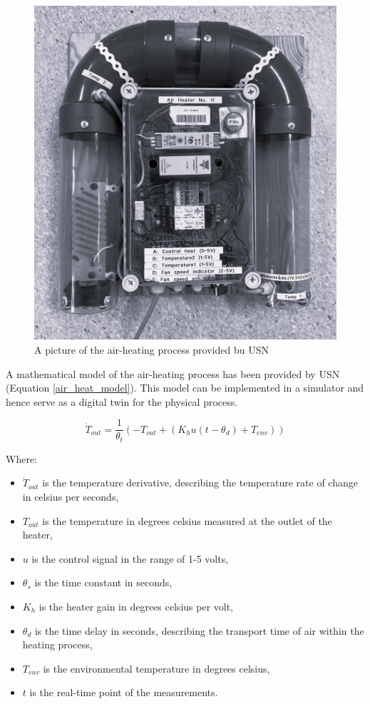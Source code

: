 \documentclass[conference]{IEEEtran}
\begin{document}
\begin{figure}[H]
    \centering
    \includegraphics[scale=0.13]{media/air_heater.png}
    \caption{A picture of the air-heating process provided bu USN}
    \label{air_heater}
\end{figure}

A mathematical model of the air-heating process has been provided by USN (Equation \ref{air_heat_model}). This model can be implemented in a simulator and hence serve as a digital twin for the physical process.

\begin{equation}
    \label{air_heat_model}
    \dot{T}_{out} = \frac{1}{\theta_t}\left(-T_{out}+\left(K_h u (t-\theta_d)+T_{env} \right)\right)
\end{equation}

Where:
\begin{itemize}
    \item[] $\dot{T}_{out}$ is the temperature derivative, describing the temperature rate of change in celsius per seconds,
    \item[] $T_{out}$ is the temperature in degrees celsius measured at the outlet of the heater,
    \item[] $u$ is the control signal in the range of 1-5 volts,
    \item[] $\theta_s$ is the time constant in seconds,
    \item[] $K_h$ is the heater gain in degrees celsius per volt,
    \item[] $\theta_d$ is the time delay in seconds, describing the transport time of air within the heating process,
    \item[] $T_{env}$ is the environmental temperature in degrees celsius,
    \item[] $t$ is the real-time point of the measurements.
\end{itemize}
\end{document}
